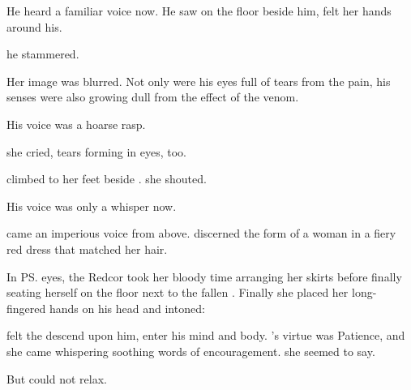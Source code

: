 \begin{garbage}
He heard a familiar voice now. \ta{\Icor!} He saw \Tiroco{} on the floor beside him, felt her hands around his. 

 he stammered. 


Her image was blurred. Not only were his eyes full of tears from the pain, his senses were also growing dull from the effect of the venom.

His voice was a hoarse rasp. 

 she cried, tears forming in eyes, too. 

\Risvet{} climbed to her feet beside \Tiroco. 
 she shouted. 

\ta{\Tiroco\prikker} His voice was only a whisper now. 


 came an imperious voice from above. \Icor{} discerned the form of a woman in a fiery red dress that matched her hair. 

In \ps{\Tiroco}{} eyes, the Redcor  took her bloody time arranging her skirts before finally seating herself on the floor next to the fallen \rayuth. Finally she placed her long-fingered hands on his head and intoned: 

% 
% 


\Icor{} felt the \Sephirah{} descend upon him, enter his mind and body. 
\Ishiel's virtue was Patience, and she came whispering soothing words of encouragement. 
 she seemed to say. 

But \Icor{} could not relax. 


\end{garbage}
